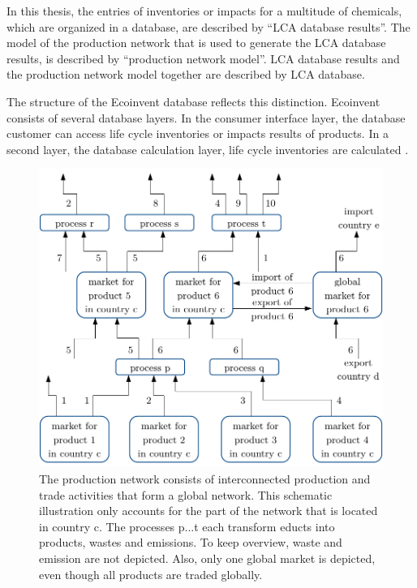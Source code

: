 In this thesis, the entries of inventories or impacts for a multitude of chemicals, which are organized in a database, are described by ``LCA database results''. The model of the production network that is used to generate the LCA database results, is described by ``production network model''. LCA database results and the production network model together are described by LCA database. 

The structure of the Ecoinvent database reflects this distinction. Ecoinvent consists of several database layers. In the consumer interface layer, the database customer can access life cycle inventories or impacts results of products. In a second layer, the database calculation layer, life cycle inventories are calculated  \cite{Frischknecht.2007}.

\begin{figure}
    \centering
    \includegraphics{images/LCA-database.pdf}
    \caption[Production network model]{The production network consists of interconnected production and trade activities that form a global network. This schematic illustration only accounts for the part of the network that is located in country c. The processes p...t each transform  educts into products, wastes and emissions. To keep overview, waste and emission are not depicted. Also, only one global market is depicted, even though all products are traded globally.}
    \label{fig:production-network}
\end{figure}

